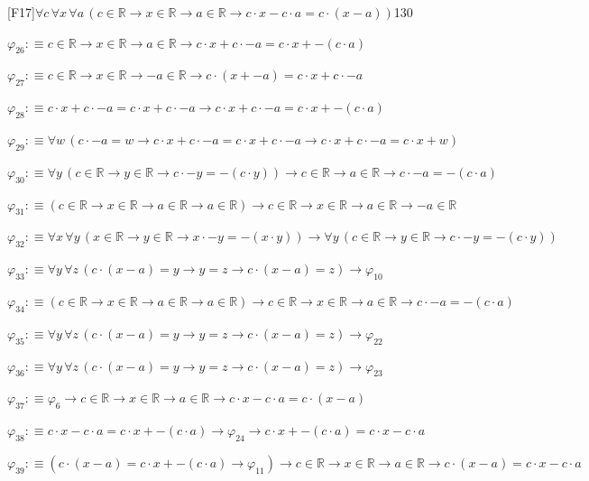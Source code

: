 \begin{fullproof}{[F17]}{$\forall c\,\forall x\,\forall a\,(c \in \mathbb{R} \to x \in \mathbb{R} \to a \in \mathbb{R} \to c \cdot x - c \cdot a = c \cdot (x - a))$}{130}
\begin{abbrevlist}
\item $\varphi_{26} :\equiv c \in \mathbb{R} \to x \in \mathbb{R} \to a \in \mathbb{R} \to c \cdot x + c \cdot -a = c \cdot x + -(c \cdot a)$
\item $\varphi_{27} :\equiv c \in \mathbb{R} \to x \in \mathbb{R} \to -a \in \mathbb{R} \to c \cdot (x + -a) = c \cdot x + c \cdot -a$
\item $\varphi_{28} :\equiv c \cdot x + c \cdot -a = c \cdot x + c \cdot -a \to c \cdot x + c \cdot -a = c \cdot x + -(c \cdot a)$
\item $\varphi_{29} :\equiv \forall w\,(c \cdot -a = w \to c \cdot x + c \cdot -a = c \cdot x + c \cdot -a \to c \cdot x + c \cdot -a = c \cdot x + w)$
\item $\varphi_{30} :\equiv \forall y\,(c \in \mathbb{R} \to y \in \mathbb{R} \to c \cdot -y = -(c \cdot y)) \to c \in \mathbb{R} \to a \in \mathbb{R} \to c \cdot -a = -(c \cdot a)$
\item $\varphi_{31} :\equiv (c \in \mathbb{R} \to x \in \mathbb{R} \to a \in \mathbb{R} \to a \in \mathbb{R}) \to c \in \mathbb{R} \to x \in \mathbb{R} \to a \in \mathbb{R} \to -a \in \mathbb{R}$
\item $\varphi_{32} :\equiv \forall x\,\forall y\,(x \in \mathbb{R} \to y \in \mathbb{R} \to x \cdot -y = -(x \cdot y)) \to \forall y\,(c \in \mathbb{R} \to y \in \mathbb{R} \to c \cdot -y = -(c \cdot y))$
\item $\varphi_{33} :\equiv \forall y\,\forall z\,(c \cdot (x - a) = y \to y = z \to c \cdot (x - a) = z) \to \varphi_{10}$
\item $\varphi_{34} :\equiv (c \in \mathbb{R} \to x \in \mathbb{R} \to a \in \mathbb{R} \to a \in \mathbb{R}) \to c \in \mathbb{R} \to x \in \mathbb{R} \to a \in \mathbb{R} \to c \cdot -a = -(c \cdot a)$
\item $\varphi_{35} :\equiv \forall y\,\forall z\,(c \cdot (x - a) = y \to y = z \to c \cdot (x - a) = z) \to \varphi_{22}$
\item $\varphi_{36} :\equiv \forall y\,\forall z\,(c \cdot (x - a) = y \to y = z \to c \cdot (x - a) = z) \to \varphi_{23}$
\item $\varphi_{37} :\equiv \varphi_{6} \to c \in \mathbb{R} \to x \in \mathbb{R} \to a \in \mathbb{R} \to c \cdot x - c \cdot a = c \cdot (x - a)$
\item $\varphi_{38} :\equiv c \cdot x - c \cdot a = c \cdot x + -(c \cdot a) \to \varphi_{24} \to c \cdot x + -(c \cdot a) = c \cdot x - c \cdot a$
\item $\varphi_{39} :\equiv (c \cdot (x - a) = c \cdot x + -(c \cdot a) \to \varphi_{11}) \to c \in \mathbb{R} \to x \in \mathbb{R} \to a \in \mathbb{R} \to c \cdot (x - a) = c \cdot x - c \cdot a$

\end{abbrevlist}
\end{fullproof}
